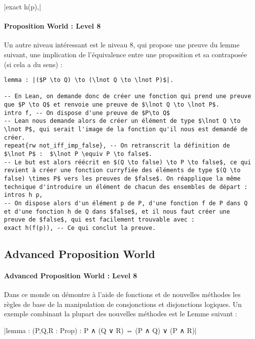 |exact h(p),| 

\paragraph{Proposition World : Level 8}
Un autre niveau intéressant est le niveau 8, qui propose une preuve du lemme suivant, une implication de l'équivalence entre une proposition et sa contraposée (si cela a du sens) : 

\begin{verbatim}
lemma : |($P \to Q) \to (\lnot Q \to \lnot P)$|. 

-- En Lean, on demande donc de créer une fonction qui prend une preuve que $P \to Q$ et renvoie une preuve de $\lnot Q \to \lnot P$.
intro f, -- On dispose d'une preuve de $P\to Q$ 
-- Lean nous demande alors de créer un élément de type $\lnot Q \to \lnot P$, qui serait l'image de la fonction qu'il nous est demandé de créer.
repeat{rw not_iff_imp_false}, -- On retranscrit la définition de $\lnot P$ :  $\lnot P \equiv P \to false$.
-- Le but est alors réécrit en $(Q \to false) \to P \to false$, ce qui revient à créer une fonction curryfiée des éléments de type $(Q \to false) \times P$ vers les preuves de $false$. On réapplique la même technique d'introduire un élément de chacun des ensembles de départ : 
intros h p,
-- On dispose alors d'un élément p de P, d'une fonction f de P dans Q et d'une fonction h de Q dans $false$, et il nous faut créer une preuve de $false$, qui est facilement trouvable avec : 
exact h(f(p)), -- Ce qui conclut la preuve. 
\end{verbatim}


\subsection{Advanced Proposition World}
\paragraph{Advanced Proposition World : Level 8}
Dans ce monde on démontre à l'aide de fonctions et de nouvelles méthodes les règles de base de la manipulation de consjonctions et disjonctions logiques. Un exemple combinant la plupart des nouvelles méthodes est le Lemme suivant : 


|lemma : (P,Q,R : Prop) : P ∧ (Q ∨ R) ⇔ (P ∧ Q) ∨ (P ∧ R)|

